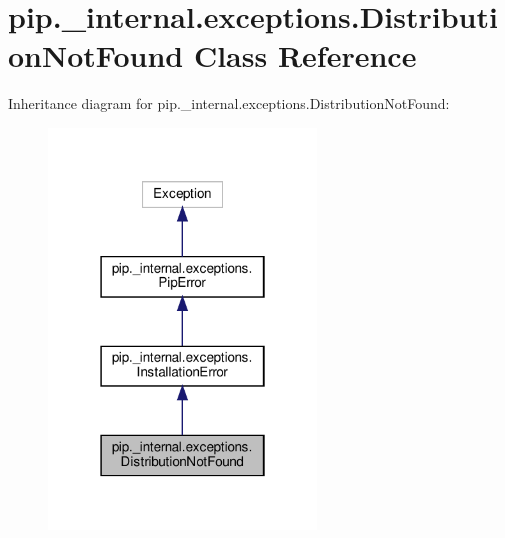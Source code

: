 \hypertarget{classpip_1_1__internal_1_1exceptions_1_1DistributionNotFound}{}\section{pip.\+\_\+internal.\+exceptions.\+Distribution\+Not\+Found Class Reference}
\label{classpip_1_1__internal_1_1exceptions_1_1DistributionNotFound}


Inheritance diagram for pip.\+\_\+internal.\+exceptions.\+Distribution\+Not\+Found\+:
\nopagebreak
\begin{figure}[H]
\begin{center}
\leavevmode
\includegraphics[width=202pt]{classpip_1_1__internal_1_1exceptions_1_1DistributionNotFound__inherit__graph}
\end{center}
\end{figure}



